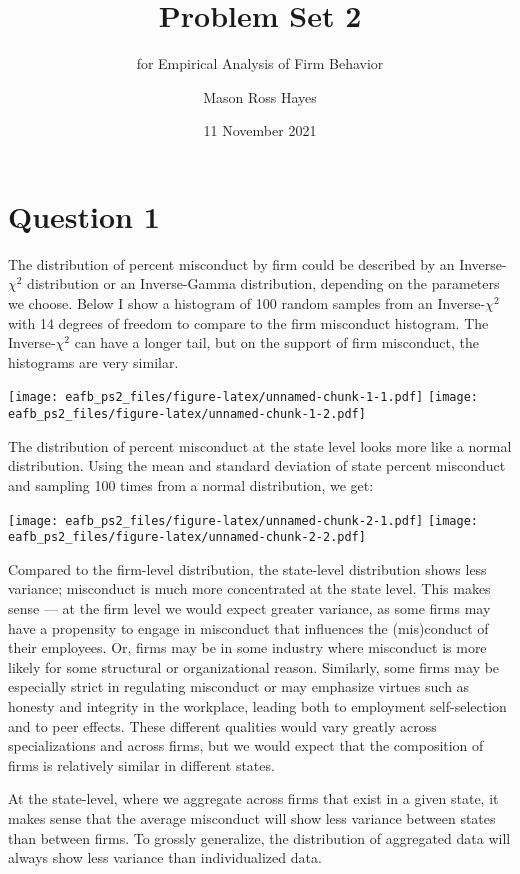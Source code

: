 \documentclass[
]{article}
\title{Problem Set 2}
\subtitle{for Empirical Analysis of Firm Behavior}
\author{Mason Ross Hayes}
\date{11 November 2021}
\begin{document}
\maketitle

\hypertarget{question-1}{%
\section{Question 1}\label{question-1}}

The distribution of percent misconduct by firm could be described by an
Inverse-\(\chi^2\) distribution or an Inverse-Gamma distribution,
depending on the parameters we choose. Below I show a histogram of 100
random samples from an Inverse-\(\chi^2\) with 14 degrees of freedom to
compare to the firm misconduct histogram. The Inverse-\(\chi^2\) can
have a longer tail, but on the support of firm misconduct, the
histograms are very similar.

\texttt{[image: eafb\_ps2\_files/figure-latex/unnamed-chunk-1-1.pdf]}
\texttt{[image: eafb\_ps2\_files/figure-latex/unnamed-chunk-1-2.pdf]}

The distribution of percent misconduct at the state level looks more
like a normal distribution. Using the mean and standard deviation of
state percent misconduct and sampling 100 times from a normal
distribution, we get:

\texttt{[image: eafb\_ps2\_files/figure-latex/unnamed-chunk-2-1.pdf]}
\texttt{[image: eafb\_ps2\_files/figure-latex/unnamed-chunk-2-2.pdf]}

Compared to the firm-level distribution, the state-level distribution
shows less variance; misconduct is much more concentrated at the state
level. This makes sense --- at the firm level we would expect greater
variance, as some firms may have a propensity to engage in misconduct
that influences the (mis)conduct of their employees. Or, firms may be in
some industry where misconduct is more likely for some structural or
organizational reason. Similarly, some firms may be especially strict in
regulating misconduct or may emphasize virtues such as honesty and
integrity in the workplace, leading both to employment self-selection
and to peer effects. These different qualities would vary greatly across
specializations and across firms, but we would expect that the
composition of firms is relatively similar in different states.

At the state-level, where we aggregate across firms that exist in a
given state, it makes sense that the average misconduct will show less
variance between states than between firms. To grossly generalize, the
distribution of aggregated data will always show less variance than
individualized data.
\end{document}

